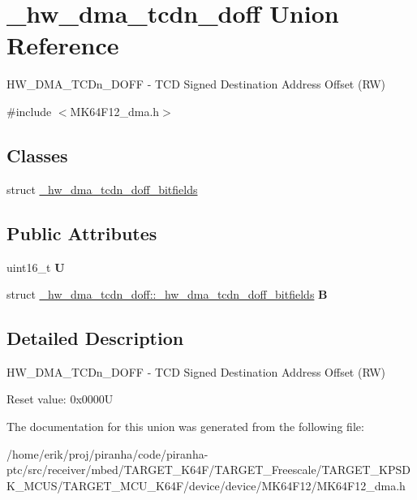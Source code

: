 \hypertarget{union__hw__dma__tcdn__doff}{}\section{\+\_\+hw\+\_\+dma\+\_\+tcdn\+\_\+doff Union Reference}
\label{union__hw__dma__tcdn__doff}


H\+W\+\_\+\+D\+M\+A\+\_\+\+T\+C\+Dn\+\_\+\+D\+O\+FF -\/ T\+CD Signed Destination Address Offset (RW)  




{\ttfamily \#include $<$M\+K64\+F12\+\_\+dma.\+h$>$}

\subsection*{Classes}
\begin{DoxyCompactItemize}
\item 
struct \hyperlink{struct__hw__dma__tcdn__doff_1_1__hw__dma__tcdn__doff__bitfields}{\+\_\+hw\+\_\+dma\+\_\+tcdn\+\_\+doff\+\_\+bitfields}
\end{DoxyCompactItemize}
\subsection*{Public Attributes}
\begin{DoxyCompactItemize}
\item 
uint16\+\_\+t {\bfseries U}\hypertarget{union__hw__dma__tcdn__doff_a14f9bf5b3a5abbf37af95fbe36fd00bd}{}\label{union__hw__dma__tcdn__doff_a14f9bf5b3a5abbf37af95fbe36fd00bd}

\item 
struct \hyperlink{struct__hw__dma__tcdn__doff_1_1__hw__dma__tcdn__doff__bitfields}{\+\_\+hw\+\_\+dma\+\_\+tcdn\+\_\+doff\+::\+\_\+hw\+\_\+dma\+\_\+tcdn\+\_\+doff\+\_\+bitfields} {\bfseries B}\hypertarget{union__hw__dma__tcdn__doff_a06290fabb164f45950755eac54d46253}{}\label{union__hw__dma__tcdn__doff_a06290fabb164f45950755eac54d46253}

\end{DoxyCompactItemize}


\subsection{Detailed Description}
H\+W\+\_\+\+D\+M\+A\+\_\+\+T\+C\+Dn\+\_\+\+D\+O\+FF -\/ T\+CD Signed Destination Address Offset (RW) 

Reset value\+: 0x0000U 

The documentation for this union was generated from the following file\+:\begin{DoxyCompactItemize}
\item 
/home/erik/proj/piranha/code/piranha-\/ptc/src/receiver/mbed/\+T\+A\+R\+G\+E\+T\+\_\+\+K64\+F/\+T\+A\+R\+G\+E\+T\+\_\+\+Freescale/\+T\+A\+R\+G\+E\+T\+\_\+\+K\+P\+S\+D\+K\+\_\+\+M\+C\+U\+S/\+T\+A\+R\+G\+E\+T\+\_\+\+M\+C\+U\+\_\+\+K64\+F/device/device/\+M\+K64\+F12/M\+K64\+F12\+\_\+dma.\+h\end{DoxyCompactItemize}
